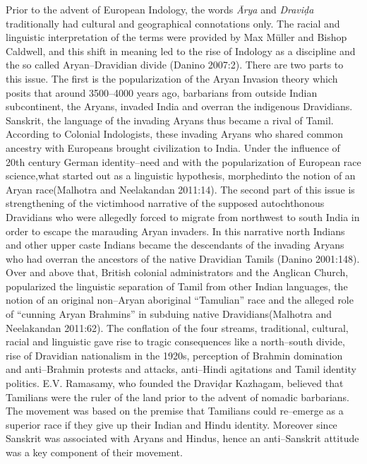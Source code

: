 Prior to the advent of European Indology, the words \textit{Ārya} and \textit{Draviḍa} traditionally had cultural and geographical connotations only. The racial and linguistic interpretation of the terms were provided by Max Müller and Bishop Caldwell, and this shift in meaning led to the rise of Indology as a discipline and the so called Aryan–Dravidian divide (Danino 2007:2). There are two parts to this issue. The first is the popularization of the Aryan Invasion theory which posits that around 3500–4000 years ago, barbarians from outside Indian subcontinent, the Aryans, invaded India and overran the indigenous Dravidians. Sanskrit, the language of the invading Aryans thus became a rival of Tamil. According to Colonial Indologists, these invading Aryans who shared common ancestry with Europeans brought civilization to India. Under the influence of 20th century German identity–need and with the popularization of European race science,what started out as a linguistic hypothesis, morphedinto the notion of an Aryan race(Malhotra and Neelakandan 2011:14). The second part of this issue is strengthening of the victimhood narrative of the supposed autochthonous Dravidians who were allegedly forced to migrate from northwest to south India in order to escape the marauding Aryan invaders. In this narrative north Indians and other upper caste Indians became the descendants of the invading Aryans who had overran the ancestors of the native Dravidian Tamils (Danino 2001:148). Over and above that, British colonial administrators and the Anglican Church, popularized the linguistic separation of Tamil from other Indian languages, the notion of an original non–Aryan aboriginal “Tamulian” race and the alleged role of “cunning Aryan Brahmins” in subduing native Dravidians(Malhotra and Neelakandan 2011:62). The conflation of the four streams, traditional, cultural, racial and linguistic gave rise to tragic consequences like a north–south divide, rise of Dravidian nationalism in the 1920s, perception of Brahmin domination and anti–Brahmin protests and attacks, anti–Hindi agitations and Tamil identity politics. E.V. Ramasamy, who founded the Draviḍar Kazhagam, believed that Tamilians were the ruler of the land prior to the advent of nomadic barbarians. The movement was based on the premise that Tamilians could re–emerge as a superior race if they give up their Indian and Hindu identity. Moreover since Sanskrit was associated with Aryans and Hindus, hence an anti–Sanskrit attitude was a key component of their movement.

